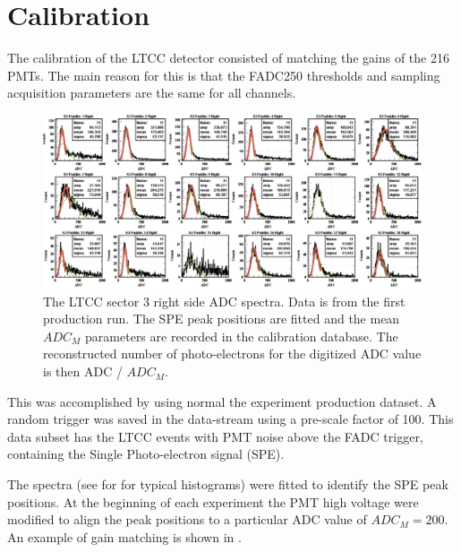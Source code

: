 \section{Calibration}

The calibration of the LTCC detector consisted of matching the gains of the 216 PMTs.
The main reason for this is that the FADC250 thresholds and sampling acquisition parameters are the same for all channels.

\begin{figure}[ht]
	\centering
	\includegraphics[width=1.99\columnwidth,keepaspectratio]{img/spe.png}
	\caption{The LTCC sector 3 right side ADC spectra. Data is from the first production run. The SPE peak positions are fitted and the mean $ADC_M$
            parameters are recorded in the calibration database. The reconstructed number of photo-electrons for the digitized ADC value is then ADC / $ADC_M$.}
	\label{fig:speCalibration}
\end{figure}

This was accomplished by using normal the experiment production dataset.
A random trigger was saved in the data-stream using a pre-scale factor of 100.
This data subset has the LTCC events with PMT noise above the FADC trigger, containing the Single Photo-electron signal (SPE).

The spectra (see for  for typical histograms) were fitted to identify the SPE peak positions.
At the beginning of each experiment the PMT high voltage were modified to align the peak positions
to a particular ADC value of $ADC_M = 200$. An example of gain matching is shown in .


